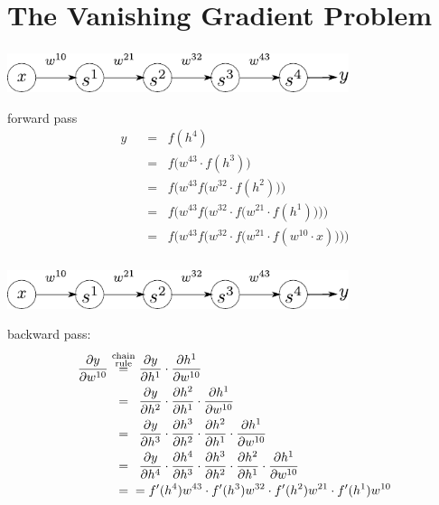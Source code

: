 \section{The Vanishing Gradient Problem}

\begin{frame}\frametitle{\secname}
	\begin{center}
		\includegraphics[width=10cm]{img/simple_arch}
	\end{center}
    forward pass
    \begin{align}
    y\;\;&=\;\;
    f(h^{4})\\
    \;\;&=\;\;
    f\big(w^{43} \cdot f(h^{3})\big)\\
    \;\;&=\;\;
    f\Big(w^{43} f\big(w^{32} \cdot f(h^{2})\big)\Big)\\
    \;\;&=\;\;
    f\bigg(w^{43} f\Big(w^{32} \cdot f\big(w^{21} \cdot f(h^{1})\big)\Big)\bigg)\\
    \;\;&=\;\;
    f\bigg(w^{43} f\Big(w^{32} \cdot f\big(w^{21} \cdot f(w^{10} \cdot x)\big)\Big)\bigg)
    \end{align}
\end{frame}

\begin{frame}\frametitle{\secname}
	\begin{center}
		\includegraphics[width=10cm]{img/simple_arch}
	\end{center}
    backward pass:
    \begin{align}
     \frac{\partial y}{\partial w^{10}}
     \;\;&\stackrel{\mathclap{
    \substack{\text{chain}\\ \text{rule}}}
    }{=}\;\;
    \frac{\partial y}{\partial h^{1}}
    \cdot \frac{\partial h^1}{\partial w^{10}}\\
    \;\;&=\;\;
    \frac{\partial y}{\partial h^{2}}
    \cdot \frac{\partial h^{2}}{\partial h^{1}}
    \cdot \frac{\partial h^1}{\partial w^{10}}\\
    \;\;&=\;\;
    \frac{\partial y}{\partial h^{3}}
    \cdot \frac{\partial h^{3}}{\partial h^{2}}
    \cdot \frac{\partial h^{2}}{\partial h^{1}}
    \cdot \frac{\partial h^1}{\partial w^{10}}\\
    \;\;&=\;\;
    \frac{\partial y}{\partial h^{4}}
    \cdot \frac{\partial h^{4}}{\partial h^{3}}
    \cdot \frac{\partial h^{3}}{\partial h^{2}}
    \cdot \frac{\partial h^{2}}{\partial h^{1}}
    \cdot \frac{\partial h^1}{\partial w^{10}}\\
    \;\;&=\;\;
    =f'(h^{4}) w^{43} \cdot f'(h^{3}) w^{32} \cdot f'(h^{2}) w^{21} \cdot f'(h^{1}) w^{10}
    \end{align}
\end{frame}


